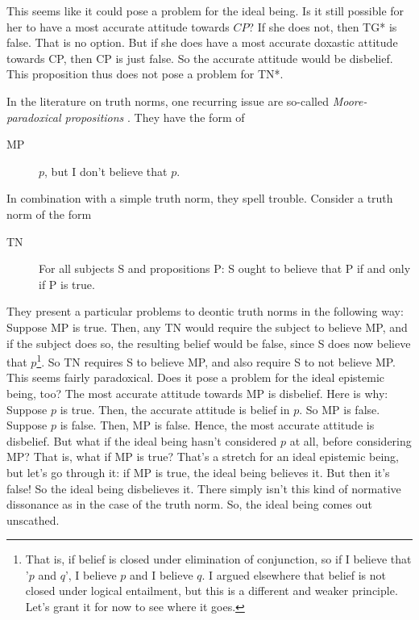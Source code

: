 \documentclass[12pt,numbers=noenddot]{scrartcl}
\begin{document}
This seems like it could pose a problem for the ideal being. Is it still possible for her to have a most accurate attitude towards $CP$?
If she does not, then TG* is false. That is no option. But if she does have a most accurate doxastic attitude towards CP, then CP is just false. So the accurate attitude would be disbelief. This proposition thus does not pose a problem for TN*.

In the literature on truth norms, one recurring issue are so-called \emph{Moore-paradoxical propositions} \autocite[6]{Wedgwood2013-WEDTRT}. They have the form of 
\begin{description}
    \item[MP] $p$, but I don't believe that $p$.
\end{description}
In combination with a simple truth norm, they spell trouble. Consider a truth norm of the form
\begin{description}
    \item[TN] For all subjects S and propositions P: S ought to believe that P if and only if P is true.
\end{description}

They present a particular problems to deontic truth norms in the following way: Suppose MP is true. Then, any TN would require the subject to believe MP, and if the subject does so, the resulting belief would be false, since S does now believe that $p$\footnote{That is, if belief is closed under elimination of conjunction, so if I believe that '$p$ and $q$', I believe $p$ and I believe $q$. I argued elsewhere that belief is not closed under logical entailment, but this is a different and weaker principle. Let's grant it for now to see where it goes.}. So TN requires S to believe MP, and also require S to not believe MP. This seems fairly paradoxical. Does it pose a problem for the ideal epistemic being, too? The most accurate attitude towards MP is disbelief. Here is why: Suppose $p$ is true. Then, the accurate attitude is belief in $p$. So MP is false. Suppose $p$ is false. Then, MP is false. Hence, the most accurate attitude is disbelief. But what if the ideal being hasn't considered $p$ at all, before considering MP? That is, what if MP is true? That's a stretch for an ideal epistemic being, but let's go through it: if MP is true, the ideal being believes it. But then it's false! So the ideal being disbelieves it. There simply isn't this kind of normative dissonance as in the case of the truth norm. So, the ideal being comes out unscathed.
\end{document}
